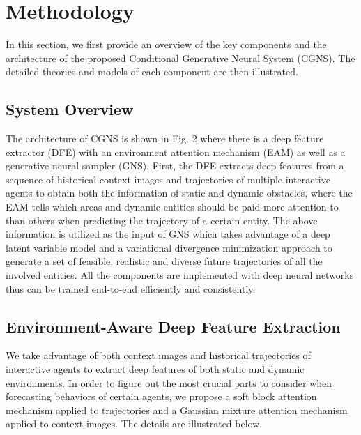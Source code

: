 \documentclass[letterpaper, 10 pt, conference]{ieeeconf}
\begin{document}
\section{Methodology}
In this section, we first provide an overview of the key components and the architecture of the proposed Conditional Generative Neural System (CGNS). The detailed theories and models of each component are then illustrated. 


\subsection{System Overview}
The architecture of CGNS is shown in Fig. 2 where there is a deep feature extractor (DFE) with an environment attention mechanism (EAM) as well as a generative neural sampler (GNS). 
First, the DFE extracts deep features from a sequence of historical context images and trajectories of multiple interactive agents to obtain both the information of static and dynamic obstacles, where the EAM tells which areas and dynamic entities should be paid more attention to than others when predicting the trajectory of a certain entity.
The above information is utilized as the input of GNS which takes advantage of a deep latent variable model and a variational divergence minimization approach to generate a set of feasible, realistic and diverse future trajectories of all the involved entities.
All the components are implemented with deep neural networks thus can be trained end-to-end efficiently and consistently.


\subsection{Environment-Aware Deep Feature Extraction}
We take advantage of both context images and historical trajectories of interactive agents to extract deep features of both static and dynamic environments. 
In order to figure out the most crucial parts to consider when forecasting behaviors of certain agents, we propose a soft block attention mechanism applied to trajectories and a Gaussian mixture attention mechanism applied to context images. The details are illustrated below.
\end{document}
